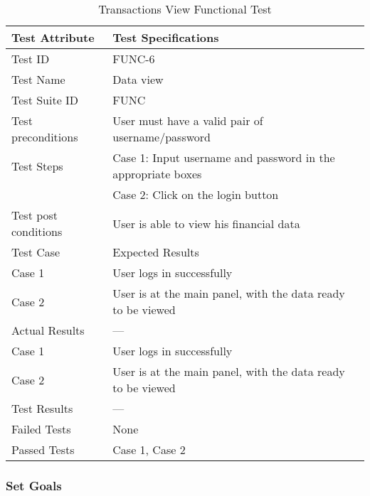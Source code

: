 \documentclass{article}
\begin{document}
\begin{table}[htbp]
\begin{center}
\begin{tabular}{|l | l|}
\hline
Test Attribute & Test Specifications \\
\hline
Test ID & FUNC-6 \\
\hline
Test Name  & Data view \\
\hline
Test Suite  ID & FUNC \\
\hline
Test preconditions & User must have a valid pair of username/password \\
\hline
Test Steps & Case 1: Input username and password in the appropriate boxes \\
\hline
  & Case 2: Click on the login button \\
\hline
Test post conditions & User is able to view his financial data \\
\hline
Test Case & Expected Results\\
\hline
Case 1  &  User logs in successfully\\
\hline
Case 2 &  User is at the main panel, with the data ready to be viewed  \\
\hline
Actual Results & ---\\
\hline
Case 1  &  User logs in successfully\\
\hline
Case 2 &  User is at the main panel, with the data ready to be viewed  \\
\hline
Test Results & ---\\
\hline
Failed Tests & None\\
\hline
Passed Tests & Case 1, Case 2\\
\hline
\end{tabular}
\end{center}
\caption{Transactions View Functional Test}
\end{table}
\label{table:2f}

\clearpage

\subsubsection{Set Goals}
\end{document}
